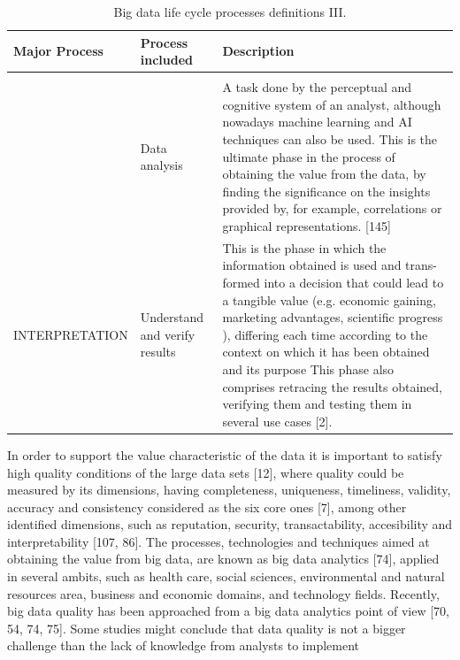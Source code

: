 \begin{table}[H]
    \caption{Big data life cycle processes definitions III.}
    \label{table:big_data_life_cyle_processes_definition_III}
    \centering
    \begin{tabular}{p{4.0cm} p{3.1cm} p{7cm}}
    \toprule
    \textbf{Major Process} & \textbf{Process included} & \textbf{Description} \\ 
    \bottomrule   
    & \\ & Data analysis & A task done by the perceptual and
    cognitive system of an analyst, although nowadays machine learning
    and AI techniques can also be used. This is the ultimate phase in the process of obtaining the value from the
    data, by finding the significance on the insights provided by, for example,
    correlations or graphical representations. [145]
    \\
    INTERPRETATION & Understand and verify results & This is the phase in which the information obtained is used and trans-
    formed into a decision that could lead
    to a tangible value (e.g. economic gaining, marketing advantages, scientific progress ), differing each time
    according to the context on which it has been obtained and its purpose This phase also comprises retracing
    the results obtained, verifying them and testing them in several use cases
    [2].
    \\
    \bottomrule
\end{tabular}
\end{table}

In order to support the value characteristic of the data it is important to satisfy
high quality conditions of the large data sets [12], where quality could be measured
by its dimensions, having completeness, uniqueness, timeliness, validity, accuracy and
consistency considered as the six core ones [7], among other identified dimensions,
such as reputation, security, transactability, accesibility and interpretability [107, 86].
The processes, technologies and techniques aimed at obtaining the value from big
data, are known as big data analytics [74], applied in several ambits, such as health
care, social sciences, environmental and natural resources area, business and economic
domains, and technology fields. Recently, big data quality has been approached from a
big data analytics point of view [70, 54, 74, 75]. Some studies might conclude that data
quality is not a bigger challenge than the lack of knowledge from analysts to implement 

